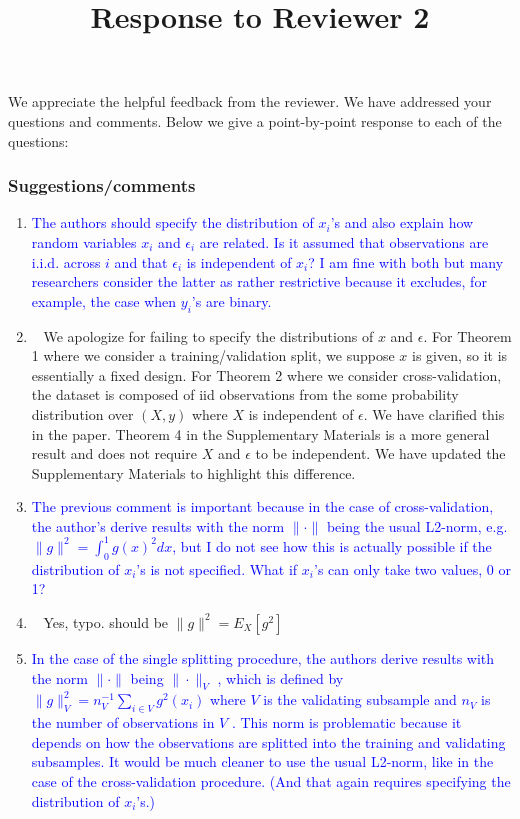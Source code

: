 \documentclass[]{article}
\title{Response to Reviewer 2}
\newcommand{\point}[1]{\item \textcolor{blue}{#1}}
\newcommand{\reply}{\item[]\ }
\begin{document}
	
	\maketitle
	
	We appreciate the helpful feedback from the reviewer. We have addressed your questions and comments. Below we give a point-by-point response to each of the questions:
	
	\subsubsection*{Suggestions/comments}
	
	\begin{enumerate}
		\point{
			The authors should specify the distribution of $x_i$'s and also explain how random variables $x_i$ and $\epsilon_i$ are related. Is it assumed that observations are i.i.d. across $i$ and that $\epsilon_i$ is independent of $x_i$? I am fine with both but many researchers consider the latter as rather restrictive because it excludes, for example, the case when $y_i$’s are binary.
		}
	
		\reply{
			We apologize for failing to specify the distributions of $x$ and $\epsilon$.
			For Theorem 1 where we consider a training/validation split, we suppose $x$ is given, so it is essentially a fixed design.
			For Theorem 2 where we consider cross-validation, the dataset is composed of iid observations from the some probability distribution over $(X,y)$ where $X$ is independent of $\epsilon$.
			We have clarified this in the paper.
			Theorem 4 in the Supplementary Materials is a more general result and does not require $X$ and $\epsilon$ to be independent.
			We have updated the Supplementary Materials to highlight this difference.
		}
		
		\point {
			The previous comment is important because in the case of cross-validation, the author's derive results with the norm $\| \cdot \|$ being the usual L2-norm, e.g. $\|g\|^2 = \int_0^1 g(x)^2 dx $, but I do not see how this is actually possible if the distribution of $x_i$’s is not specified. What if $x_i$’s can only take two values, 0 or 1?
		}
	
		\reply{
			Yes, typo. should be $\|g\|^2 = E_X[g^2]$
		}
		
	
		\point{
			In the case of the single splitting procedure, the authors derive results with the norm $\|\cdot\|$ being $\|\cdot\|_V$ , which is defined by $\|g \|_V^2 = n_V^{-1} \sum_{i\in V} g^2(x_i)$ where $V$ is the validating subsample and $n_V$ is the number of observations in $V$ . This norm is problematic because it depends on how the observations are splitted into the training and validating subsamples. It would be much cleaner to use the usual L2-norm, like in the case of the cross-validation procedure. (And that again requires specifying the distribution of $x_i$’s.)
		}
	

\end{enumerate}
\end{document}
